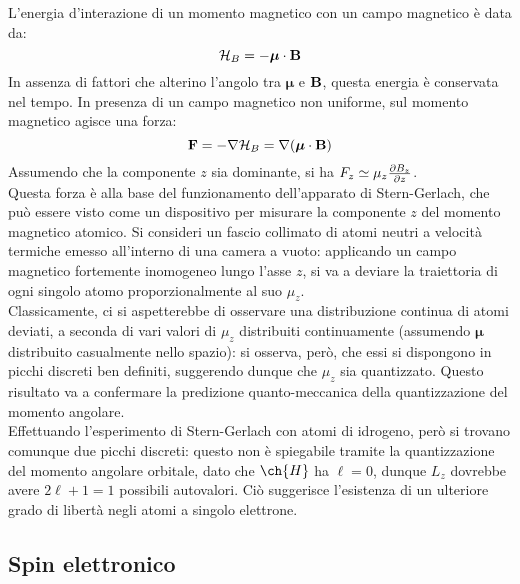 L'energia d'interazione di un momento magnetico con un campo magnetico è data da:
\begin{equation}
	\mathcal{H}_B = - \boldsymbol{\mu} \cdot \mathbf{B}
	\label{eq:ham-mag-int}
\end{equation}
In assenza di fattori che alterino l'angolo tra $ \boldsymbol{\mu} $ e $ \mathbf{B} $, questa energia è conservata nel tempo. In presenza di un campo magnetico non uniforme, sul momento magnetico agisce una forza:
\begin{equation}
	\mathbf{F} = - \nabla \mathcal{H}_B = \nabla (\boldsymbol{\mu} \cdot \mathbf{B})
	\label{eq:stern-gerlach}
\end{equation}
Assumendo che la componente $ z $ sia dominante, si ha $ F_z \simeq \mu_z \frac{\partial B_z}{\partial z} $.\\
Questa forza è alla base del funzionamento dell'apparato di Stern-Gerlach, che può essere visto come un dispositivo per misurare la componente $ z $ del momento magnetico atomico. Si consideri un fascio collimato di atomi neutri a velocità termiche emesso all'interno di una camera a vuoto: applicando un campo magnetico fortemente inomogeneo lungo l'asse $ z $, si va a deviare la traiettoria di ogni singolo atomo proporzionalmente al suo $ \mu_z $.\\
Classicamente, ci si aspetterebbe di osservare una distribuzione continua di atomi deviati, a seconda di vari valori di $ \mu_z $ distribuiti continuamente (assumendo $ \boldsymbol{\mu} $ distribuito casualmente nello spazio): si osserva, però, che essi si dispongono in picchi discreti ben definiti, suggerendo dunque che $ \mu_z $ sia quantizzato. Questo risultato va a confermare la predizione quanto-meccanica della quantizzazione del momento angolare.\\
Effettuando l'esperimento di Stern-Gerlach con atomi di idrogeno, però si trovano comunque due picchi discreti: questo non è spiegabile tramite la quantizzazione del momento angolare orbitale, dato che $ \ch{H} $ ha $ \ell = 0 $, dunque $ L_z $ dovrebbe avere $ 2\ell + 1 = 1 $ possibili autovalori. Ciò suggerisce l'esistenza di un ulteriore grado di libertà negli atomi a singolo elettrone.

\subsection{Spin elettronico}

